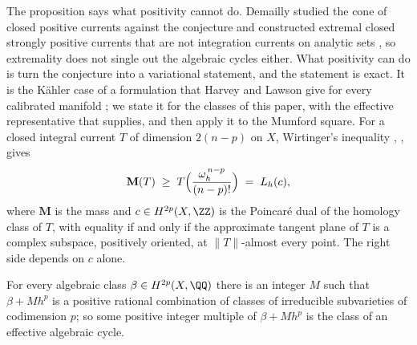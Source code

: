 The proposition says what positivity cannot do. Demailly studied the cone of
closed positive currents against the conjecture and constructed extremal
closed strongly positive currents that are not integration currents on
analytic sets \cite{Dem82}, so extremality does not single out the algebraic
cycles either. What positivity can do is turn the conjecture into a
variational statement, and the statement is exact. It is the K\"ahler case of
a formulation that Harvey and Lawson give for every calibrated manifold
\cite[Section~6, Proposition~6.13 and Remarks~6.9 and~6.11]{HL09}; we state
it for the classes of this paper, with the effective representative that
 supplies, and then apply it to the Mumford square. For a
closed integral current $T$ of dimension $2(n-p)$ on $X$, Wirtinger's
inequality \cite[1.8.2]{Fed69}, \cite{HK74}, \cite[II.3]{HL82} gives
\begin{equation}\label{eq:wirtinger}
  \mathbf{M}(T)\;\ge\;T\Bigl(\frac{\omega_{h}^{\,n-p}}{(n-p)!}\Bigr)
  \;=\;L_{h}(c),
\end{equation}
where $\mathbf{M}$ is the mass and $c\in H^{2p}(X,\ZZ)$ is the Poincar\'e dual
of the homology class of $T$, with equality if and only if the approximate
tangent plane of $T$ is a complex subspace, positively oriented, at
$\|T\|$-almost every point. The right side depends on $c$ alone.

\begin{lemma}\label{lem:cibig}
For every algebraic class $\beta\in H^{2p}(X,\QQ)$ there is an integer $M$ such
that $\beta+Mh^{p}$ is a positive rational combination of classes of
irreducible subvarieties of codimension $p$; so some positive integer multiple
of $\beta+Mh^{p}$ is the class of an effective algebraic cycle.
\end{lemma}

